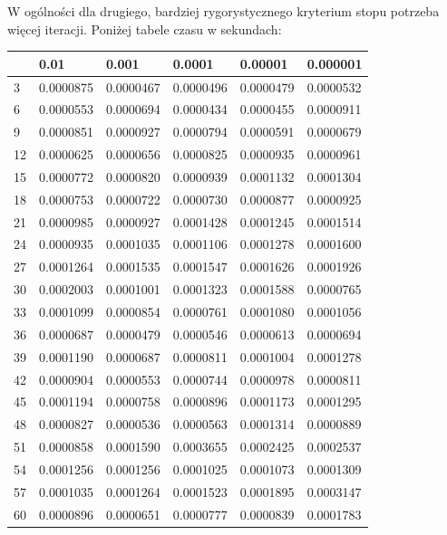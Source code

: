 \documentclass{article}
\begin{document}
W ogólności dla drugiego, bardziej rygorystycznego kryterium stopu potrzeba więcej iteracji.
Poniżej tabele czasu w sekundach:

\begin{table}[H]
\centering
\begin{tabular}{|l|l|l|l|l|l|}
\hline
& 0.01 & 0.001 & 0.0001 & 0.00001 & 0.000001 \\ \hline
3 & 0.0000875 & 0.0000467 & 0.0000496 & 0.0000479 & 0.0000532 \\ \hline
6 & 0.0000553 & 0.0000694 & 0.0000434 & 0.0000455 & 0.0000911 \\ \hline
9 & 0.0000851 & 0.0000927 & 0.0000794 & 0.0000591 & 0.0000679 \\ \hline
12 & 0.0000625 & 0.0000656 & 0.0000825 & 0.0000935 & 0.0000961 \\ \hline
15 & 0.0000772 & 0.0000820 & 0.0000939 & 0.0001132 & 0.0001304 \\ \hline
18 & 0.0000753 & 0.0000722 & 0.0000730 & 0.0000877 & 0.0000925 \\ \hline
21 & 0.0000985 & 0.0000927 & 0.0001428 & 0.0001245 & 0.0001514 \\ \hline
24 & 0.0000935 & 0.0001035 & 0.0001106 & 0.0001278 & 0.0001600 \\ \hline
27 & 0.0001264 & 0.0001535 & 0.0001547 & 0.0001626 & 0.0001926 \\ \hline
30 & 0.0002003 & 0.0001001 & 0.0001323 & 0.0001588 & 0.0000765 \\ \hline
33 & 0.0001099 & 0.0000854 & 0.0000761 & 0.0001080 & 0.0001056 \\ \hline
36 & 0.0000687 & 0.0000479 & 0.0000546 & 0.0000613 & 0.0000694 \\ \hline
39 & 0.0001190 & 0.0000687 & 0.0000811 & 0.0001004 & 0.0001278 \\ \hline
42 & 0.0000904 & 0.0000553 & 0.0000744 & 0.0000978 & 0.0000811 \\ \hline
45 & 0.0001194 & 0.0000758 & 0.0000896 & 0.0001173 & 0.0001295 \\ \hline
48 & 0.0000827 & 0.0000536 & 0.0000563 & 0.0001314 & 0.0000889 \\ \hline
51 & 0.0000858 & 0.0001590 & 0.0003655 & 0.0002425 & 0.0002537 \\ \hline
54 & 0.0001256 & 0.0001256 & 0.0001025 & 0.0001073 & 0.0001309 \\ \hline
57 & 0.0001035 & 0.0001264 & 0.0001523 & 0.0001895 & 0.0003147 \\ \hline
60 & 0.0000896 & 0.0000651 & 0.0000777 & 0.0000839 & 0.0001783 \\ \hline

\end{tabular}
\end{table}
\end{document}
